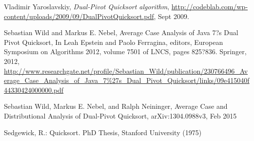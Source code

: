 \documentclass{article}
\begin{document}
\begin{thebibliography}{9}

  Vladimir Yaroslavskiy,
  \emph{Dual-Pivot Quicksort algorithm},
  \url{http://codeblab.com/wp-content/uploads/2009/09/DualPivotQuicksort.pdf},
  Sept 2009.
  
Sebastian Wild and Markus E. Nebel,
Average Case Analysis of Java 7?s Dual Pivot Quicksort,
In Leah Epstein and Paolo Ferragina, editors, 
European Symposium on Algorithms 2012, 
volume 7501 of LNCS, pages 825?836. Springer, 2012,
\url{http://www.researchgate.net/profile/Sebastian_Wild/publication/230766496_Average_Case_Analysis_of_Java_7%27s_Dual_Pivot_Quicksort/links/09e415040f44330424000000.pdf}

Sebastian Wild, Markus E. Nebel, and Ralph Neininger,
Average Case and Distributional Analysis of Dual-Pivot Quicksort,
arXiv:1304.0988v3, Feb 2015

Sedgewick, R.: Quicksort. PhD Thesis, Stanford University (1975)
\end{thebibliography}
\end{document}
